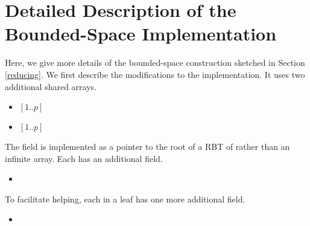 
\section{Detailed Description of the Bounded-Space Implementation}
\label{reducing-details}

\renewcommand{\algorithmiccomment}[1]{\hfill\eqparbox{COMMENTSINGLEAPP}{\com\ #1}}

Here, we give more details of the bounded-space construction sketched in Section \ref{reducing}.
We first describe the modifications to the implementation.
It uses two additional shared arrays.
\begin{itemize}
\item {} $[1..p]$ 
\item {} $[1..p]$ 
\end{itemize}
The  field is implemented as a pointer to the root of a RBT of  rather than an infinite array.
Each  has an additional field.
\begin{itemize}
\item {}  
\end{itemize}
To facilitate helping, each  in a leaf has one more additional field.
\begin{itemize}
\item {}  
\end{itemize}

\renewcommand{\algorithmiccomment}[1]{\hfill\eqparbox{COMMENTDOUBLE}{\com\ #1}}

